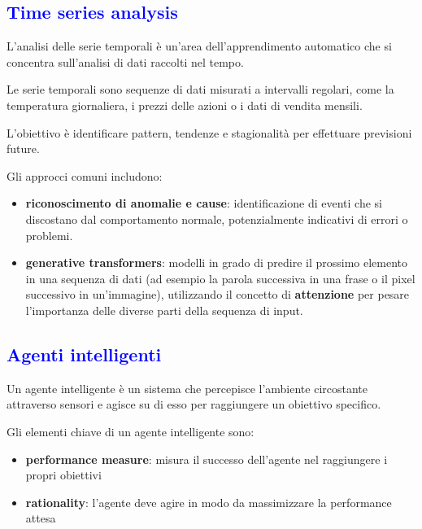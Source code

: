 \documentclass[a4paper, 12pt]{book}
\begin{document}
    \subsection*{\textcolor{blue}{Time series analysis}}
    L’analisi delle serie temporali è un’area dell’apprendimento automatico che si concentra sull’analisi di dati raccolti nel tempo.

    Le serie temporali sono sequenze di dati misurati a intervalli regolari, come la temperatura giornaliera, i prezzi delle azioni o i dati di vendita mensili.

    L’obiettivo è identificare pattern, tendenze e stagionalità per effettuare previsioni future.

    \vspace{1em}

    Gli approcci comuni includono:
    \begin{itemize}
      \item \textbf{riconoscimento di anomalie e cause}: identificazione di eventi che si discostano dal comportamento normale, potenzialmente indicativi di errori o problemi.

      \item \textbf{generative transformers}: modelli in grado di predire il prossimo elemento in una sequenza di dati (ad esempio la parola successiva in una frase o il pixel successivo in un’immagine), utilizzando il concetto di \textbf{attenzione} per pesare l’importanza delle diverse parti della sequenza di input.
    \end{itemize}

    \subsection*{\textcolor{blue}{Agenti intelligenti}}
    Un agente intelligente è un sistema che percepisce l’ambiente circostante attraverso sensori e agisce su di esso per raggiungere un obiettivo specifico.

    Gli elementi chiave di un agente intelligente sono:
    \begin{itemize}
      \item \textbf{performance measure}: misura il successo dell’agente nel raggiungere i propri obiettivi
      \item \textbf{rationality}: l’agente deve agire in modo da massimizzare la performance attesa
    \end{itemize}
\end{document}
